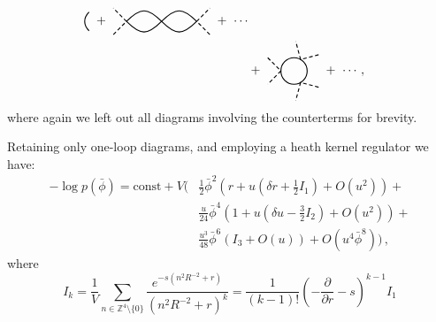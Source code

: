 \documentclass[11pt,a4paper]{article}
\begin{document}
\begin{displaymath}
\begin{split}
\begin{tikzpicture}[scale=0.5, baseline={([yshift=-.5ex]current bounding box.center)}]
    \draw[thick] (0.53, -0.53) .. controls (0.2, -0.2) 
    and (0.2, 0.2) .. (0.53, 0.53);
\end{tikzpicture}
\ + \ 
\begin{tikzpicture}[scale=0.5, baseline={([yshift=-.5ex]current bounding box.center)}]
    \draw[thick, densely dashed] (-2.75, -0.75) -- (-2, 0) -- (-2.75, 0.75);
    \draw[thick, densely dashed] (2.75, -0.75) -- (2, 0) -- (2.75, 0.75);
    \draw[thick] (-2, 0) .. controls (-1.2, 0.8) and (-0.8, 0.8) .. (0, 0) .. 
    controls (-0.8, -0.8) and (-1.2, -0.8) .. (-2, 0);
    \draw[thick] (2, 0) .. controls (1.2, 0.8) and (0.8, 0.8) .. (0, 0) .. 
    controls (0.8, -0.8) and (1.2, -0.8) .. (2, 0);
\end{tikzpicture}
 \ + \ \cdots \\
& + \ 
\begin{tikzpicture}[scale=0.5, baseline={([yshift=-.5ex]current bounding box.center)}]
    \draw[thick, densely dashed] (-1.5, 0.75) -- (-0.75, 0) -- (-1.5, -0.75) ;
    \draw[thick] (0, 0) circle (0.75cm);
    \draw[thick, densely dashed] (1.40, -0.92) -- (0.375, -0.65) -- (0.1, -1.67);
    \draw[thick, densely dashed] (1.40, 0.92) -- (0.375, 0.65) -- (0.1, 1.67);
\end{tikzpicture}
 \ + \ \cdots \,,
\end{split}
\end{displaymath}
where again we left out all diagrams involving the counterterms for brevity. 

Retaining only one-loop diagrams, and employing a heath kernel regulator we have:
\begin{equation}
\begin{split}
    -\log p(\bar{\phi}) = \mathrm{const} + V \Bigg( 
    &\frac{1}{2} \bar{\phi}^2\left( r + u \left(\delta r + \frac{1}{2} I_1\right) + O(u^2)\right) + \\
    &\frac{u}{24} \bar{\phi}^4 \left(1 + u \left(\delta u - \frac{3}{2} I_2\right) + O(u^2)\right) + \\
    &\frac{u^3}{48}\bar{\phi}^6\left(I_3 + O(u)\right) + O(u^4 \bar{\phi}^8) \Bigg)\,,
\end{split}
\end{equation}
where
\begin{equation}
    I_k = \frac{1}{V} \sum_{n\in\mathbb{Z}^4\setminus\{0\}} 
    \frac{e^{-s(n^2 R^{-2} + r)}}{\left(n^2 R^{-2} + r\right)^k} = 
    \frac{1}{(k - 1)!}\left(-\frac{\partial}{\partial r} - s\right)^{k-1} I_1
\end{equation}
\end{document}
